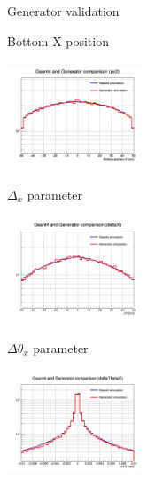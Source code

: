 \documentclass[handout,8 pt]{beamer}
\begin{document}
\begin{frame}{Generator validation}

\vspace{-5pt}
\begin{minipage}[c]{.32\textwidth}
\begin{exampleblock}{} \begin{center}Bottom X position\end{center} \end{exampleblock}
\includegraphics[width=4.2cm, height=3.2cm]{figs/px2-17p2vs17p2.png} 
\end{minipage}
\begin{minipage}[c]{.32\textwidth}
\begin{exampleblock}{} \begin{center}$\Delta_x$ parameter\end{center} \end{exampleblock}
\includegraphics[width=4.2cm, height=3.2cm]{figs/deltaX-17p2vs17p2.png}
\end{minipage}
\begin{minipage}[c]{.32\textwidth}
\begin{exampleblock}{} \begin{center}$\Delta \theta_x$ parameter\end{center} \end{exampleblock}
\includegraphics[width=4.2cm, height=3.2cm]{figs/deltaThetaX-17p2vs17p2.png}
\end{minipage} \vspace{-8pt}


\end{frame}
\end{document}
